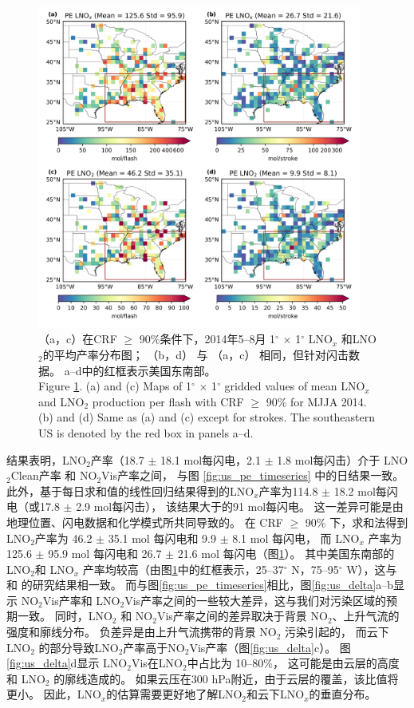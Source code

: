\begin{figure}[H]
\centering
\includegraphics[width=0.95\textwidth]{./figures/us_pe_sum.png}
\caption{（a，c）在CRF $\geq$ 90\%条件下，2014年5--8月 1$^{\circ}$ $\times$ 1$^{\circ}$ LNO$_x$ 和LNO$_2$的平均产率分布图；
     （b，d） 与 （a，c） 相同，但针对闪击数据。
     a--d中的红框表示美国东南部。\\
     Figure \ref{fig:us_pe_sum}. (a) and (c) Maps of 1$^{\circ}$ $\times$ 1$^{\circ}$ gridded values of mean LNO$_x$
    and LNO$_2$ production per flash with CRF $\geq$ 90\% for MJJA 2014.
    (b) and (d) Same as (a) and (c) except for strokes.
    The southeastern US is denoted by the red box in panels a--d.
}
\label{fig:us_pe_sum}
\end{figure}

结果表明，LNO$_2$产率（18.7 $\pm$ 18.1 mol每闪电，2.1 $\pm$ 1.8 mol每闪击）介于 LNO$_2$Clean产率 和 NO$_2$Vis产率之间，
与图 \ref{fig:us_pe_timeseries} 中的日结果一致。
此外，基于每日求和值的线性回归结果得到的LNO$_x$产率为114.8 $\pm$ 18.2 mol每闪电（或17.8 $\pm$ 2.9 mol每闪击），
该结果大于\citet{Pickering.2016}的91 mol每闪电。
这一差异可能是由地理位置、闪电数据和化学模式所共同导致的。
在 CRF $\geq$ 90\% 下，求和法得到LNO$_2$产率为 46.2 $\pm$ 35.1 mol 每闪电和 9.9 $\pm$ 8.1 mol 每闪电，
而 LNO$_x$ 产率为 125.6 $\pm$ 95.9 mol 每闪电和 26.7 $\pm$ 21.6 mol 每闪电（图\ref{fig:us_pe_sum}）。
其中美国东南部的 LNO$_2$和 LNO$_x$ 产率均较高（由图\ref{fig:us_pe_sum}中的红框表示，25--37$^{\circ}$ N，75--95$^{\circ}$ W），这与\citet{Lapierre.2020} 和 \citet{Bucsela.2019}的研究结果相一致。
而与图\ref{fig:us_pe_timeseries}相比，图\ref{fig:us_delta}a--b显示
NO$_2$Vis产率和 LNO$_2$Vis产率之间的一些较大差异，这与我们对污染区域的预期一致。
同时，LNO$_2$ 和 NO$_2$Vis产率之间的差异取决于背景 NO$_2$、上升气流的强度和廓线分布。
负差异是由上升气流携带的背景 NO$_2$ 污染引起的，
而云下 LNO$_2$ 的部分导致LNO$_2$产率高于NO$_2$Vis产率（图\ref{fig:us_delta}c）。
图\ref{fig:us_delta}d显示 LNO$_2$Vis在LNO$_2$中占比为 10--80\%，
这可能是由云层的高度和 LNO$_2$ 的廓线造成的。
如果云压在300 hPa附近，由于云层的覆盖，该比值将更小。
因此，LNO$_x$的估算需要更好地了解LNO$_2$和云下LNO$_x$的垂直分布。



